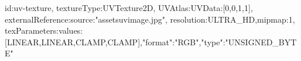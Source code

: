 {id:uv-texture,
textureType:UVTexture2D,
UVAtlas:{UVData:[0,0,1,1]},
externalReference:{source:"assets\/uvimage.jpg"},
resolution:ULTRA_HD,mipmap:1,
texParameters:{values:[LINEAR,LINEAR,CLAMP,CLAMP]},"format":"RGB","type":"UNSIGNED_BYTE"}